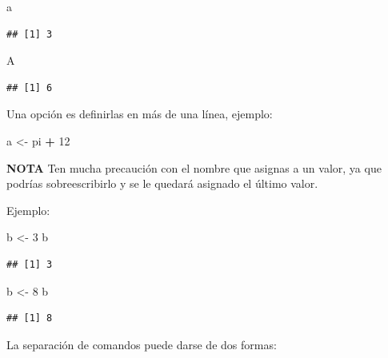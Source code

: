 \documentclass[
]{book}
\newenvironment{Shaded}{\begin{snugshade}}{\end{snugshade}}
\newcommand{\DecValTok}[1]{\textcolor[rgb]{0.00,0.00,0.81}{#1}}
\newcommand{\NormalTok}[1]{#1}
\newcommand{\OtherTok}[1]{\textcolor[rgb]{0.56,0.35,0.01}{#1}}
\newcommand{\SpecialCharTok}[1]{\textcolor[rgb]{0.81,0.36,0.00}{\textbf{#1}}}
\begin{document}
\begin{Shaded}
\begin{Highlighting}[]
\NormalTok{a}
\end{Highlighting}
\end{Shaded}

\begin{verbatim}
## [1] 3
\end{verbatim}

\begin{Shaded}
\begin{Highlighting}[]
\NormalTok{A}
\end{Highlighting}
\end{Shaded}

\begin{verbatim}
## [1] 6
\end{verbatim}

Una opción es definirlas en más de una línea, ejemplo:

\begin{Shaded}
\begin{Highlighting}[]
\NormalTok{a }\OtherTok{\textless{}{-}}
\NormalTok{  pi }\SpecialCharTok{+} \DecValTok{12}
\end{Highlighting}
\end{Shaded}

\textbf{NOTA} Ten mucha precaución con el nombre que asignas a un valor, ya que podrías sobreescribirlo y se le quedará asignado el último valor.

Ejemplo:

\begin{Shaded}
\begin{Highlighting}[]
\NormalTok{b }\OtherTok{\textless{}{-}} \DecValTok{3}
\NormalTok{b}
\end{Highlighting}
\end{Shaded}

\begin{verbatim}
## [1] 3
\end{verbatim}

\begin{Shaded}
\begin{Highlighting}[]
\NormalTok{b }\OtherTok{\textless{}{-}} \DecValTok{8} 
\NormalTok{b}
\end{Highlighting}
\end{Shaded}

\begin{verbatim}
## [1] 8
\end{verbatim}

La separación de comandos puede darse de dos formas:
\end{document}
